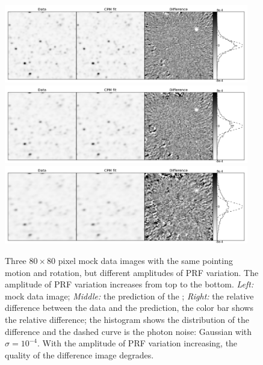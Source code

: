 \begin{figure}[p]
\begin{center}
\includegraphics[width=0.95\textwidth]{figures/cdi/f9a}
\includegraphics[width=0.95\textwidth]{figures/cdi/f9b}
\includegraphics[width=0.95\textwidth]{figures/cdi/f9c}
\end{center}
\caption[\cpmdiff\ with large PRF variation]{
  \label{large_prf}
  Three $80\times 80$ pixel mock data images with the same pointing motion and rotation, but different amplitudes of PRF variation. The amplitude of PRF variation increases from top to the bottom.
  \emph{Left:} mock data image;
  \emph{Middle:} the prediction of the \cpmdiff;
  \emph{Right:} the relative difference between the data and the prediction, the color bar shows the relative difference; the histogram shows the distribution of the difference and the dashed curve is the photon noise: Gaussian with $\sigma = 10^{-4}$. 
  With the amplitude of PRF variation increasing, the quality of the difference image degrades.
}
\end{figure}

